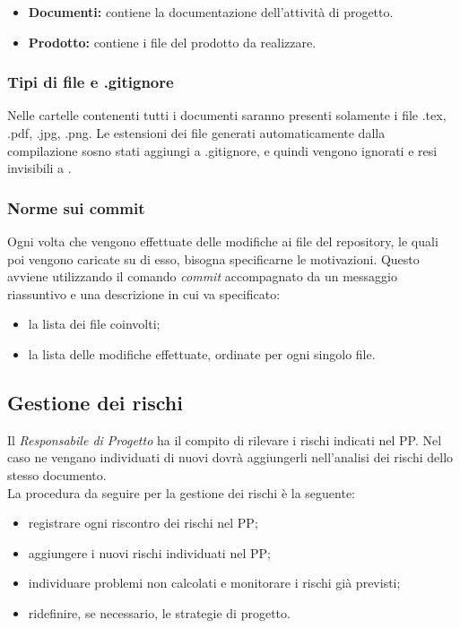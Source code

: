 \documentclass[../NormediProgetto.tex]{subfiles}
\begin{document}
	\begin{itemize}	
		\item \textbf{Documenti:} contiene la documentazione dell'attività di progetto.
		\item \textbf{Prodotto:} contiene i file del prodotto da realizzare.
	\end{itemize}
	
	\subsubsection{Tipi di file e .gitignore}
	
	Nelle cartelle contenenti tutti i documenti saranno presenti solamente i file .tex, .pdf, .jpg, .png. Le estensioni dei file generati automaticamente dalla compilazione sosno stati aggiungi a .gitignore, e quindi vengono ignorati e resi invisibili a .
	
	\subsubsection{Norme sui commit}
	
	Ogni volta che vengono effettuate delle modifiche ai file del repository, le quali poi vengono caricate su di esso, bisogna specificarne le motivazioni. Questo avviene utilizzando il comando \textit{commit} accompagnato da un messaggio riassuntivo e una descrizione in cui va specificato: 
	\begin{itemize}
		\item la lista dei file coinvolti;
		\item la lista delle modifiche effettuate, ordinate per ogni singolo file.
	\end{itemize}

	\subsection{Gestione dei rischi}
	
	Il \textit{Responsabile di Progetto} ha il compito di rilevare i rischi indicati nel PP. Nel caso ne vengano individuati di nuovi dovrà aggiungerli nell'analisi dei rischi dello stesso documento. 
	\\ \noindent La procedura da seguire per la gestione dei rischi è la seguente:
	\begin{itemize}
		\item registrare ogni riscontro dei rischi nel PP;
		\item aggiungere i nuovi rischi individuati nel PP;
		\item individuare problemi non calcolati e monitorare i rischi già previsti;
		\item ridefinire, se necessario, le strategie di progetto.
	\end{itemize}
	
\end{document}
